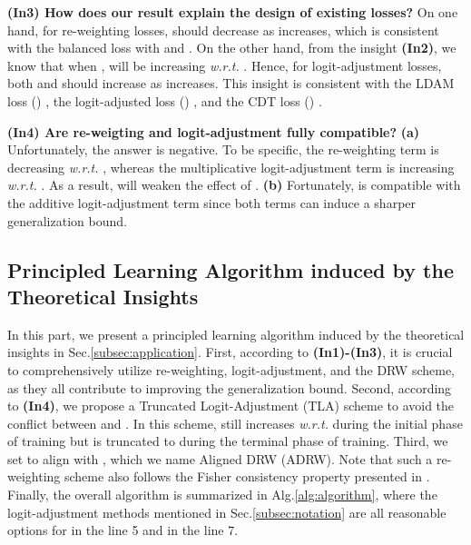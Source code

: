 \textbf{(In3) How does our result explain the design of existing losses?} On one hand, for re-weighting losses,  should decrease as  increases, which is consistent with the balanced loss with  \cite{DBLP:conf/icml/MorikBJ99} and  \cite{DBLP:conf/cvpr/CuiJLSB19}. On the other hand, from the insight \textbf{(In2)}, we know that when ,  will be increasing \textit{w.r.t.} . Hence, for logit-adjustment losses, both  and  should increase as  increases. This insight is consistent with the LDAM loss () \cite{DBLP:conf/nips/CaoWGAM19}, the logit-adjusted loss () \cite{DBLP:conf/iclr/MenonJRJVK21}, and the CDT loss () \cite{DBLP:journals/corr/abs-2001-01385}. 

\textbf{(In4) Are re-weigting and logit-adjustment fully compatible?} \textbf{(a)} Unfortunately, the answer is negative. To be specific, the re-weighting term  is decreasing \textit{w.r.t.} , whereas the multiplicative logit-adjustment term  is increasing \textit{w.r.t.} . As a result,  will weaken the effect of . \textbf{(b)} Fortunately,  is compatible with the additive logit-adjustment term  since both terms can induce a sharper generalization bound.

\subsection{Principled Learning Algorithm induced by the Theoretical Insights}
\label{subsec:algorithm}
In this part, we present a principled learning algorithm induced by the theoretical insights in Sec.\ref{subsec:application}. First, according to \textbf{(In1)-(In3)}, it is crucial to comprehensively utilize re-weighting, logit-adjustment, and the DRW scheme, as they all contribute to improving the generalization bound. Second, according to \textbf{(In4)}, we propose a Truncated Logit-Adjustment (TLA) scheme to avoid the conflict between  and . In this scheme,  still increases \textit{w.r.t.}  during the initial phase of training but is truncated to  during the terminal phase of training. Third, we set  to align  with , which we name Aligned DRW (ADRW). Note that such a re-weighting scheme also follows the Fisher consistency property presented in \cite{DBLP:conf/iclr/MenonJRJVK21}. Finally, the overall algorithm is summarized in Alg.\ref{alg:algorithm}, where the logit-adjustment methods mentioned in Sec.\ref{subsec:notation} are all reasonable options for  in the line 5 and  in the line 7.

